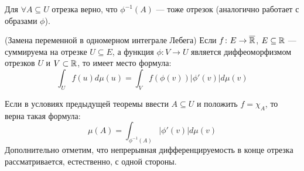 \begin{corollary}
	Для $\forall A \subseteq U$ отрезка верно, что $\phi^{-1}(A)$ --- тоже отрезок (аналогично работает с образами $\phi$).
\end{corollary}

\begin{theorem} (Замена переменной в одномерном интеграле Лебега)
	Если $f \colon E \to \overline{\mathbb{R}}$, $E \subseteq \mathbb{R}$ --- суммируема на отрезке $U \subseteq E$, а функция $\phi \colon V \to U$ является диффеоморфизмом отрезков $U$ и $V \subset \mathbb{R}$, то имеет место формула:
	\[
		\int_U f(u)d\mu(u) = \int_V f(\phi(v))|\phi'(v)|d\mu(v)
	\]
\end{theorem}

\begin{note}
	Если в условиях предыдущей теоремы ввести $A \subseteq U$ и положить $f = \chi_A$, то верна такая формула:
	\[
		\mu(A) = \int_{\phi^{-1}(A)} |\phi'(v)|d\mu(v)
	\]
	Дополнительно отметим, что непрерывная дифференцируемость в конце отрезка рассматривается, естественно, с одной стороны.
\end{note}


